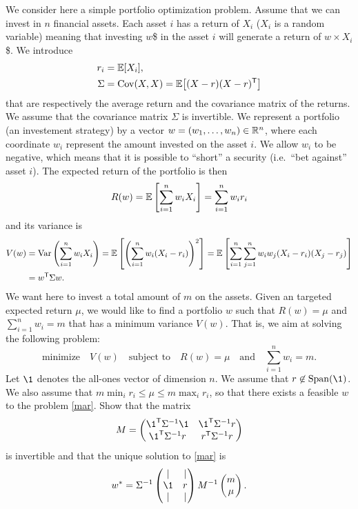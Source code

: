 \documentclass[11pt,nocut]{article}
\begin{document}
\begin{problem}[$\star$]
	We consider here a simple portfolio optimization problem.
	Assume that we can invest in $n$ financial assets. Each asset $i$ has a return of $X_i$ ($X_i$ is a random variable) meaning that investing $w$\$ in the asset $i$ will generate a return of $w \times X_i$ \$. We introduce
	\begin{align*}
		r_i &= \mathbb{E}[X_i], \\
		\Sigma &= {{\rm Cov}}(X,X) = \mathbb{E}\big[(X-r) (X-r)^{{\sf T}}\big]
	\end{align*}
	that are respectively the average return and the covariance matrix of the returns. 
	We assume that the covariance matrix $\Sigma$ is invertible. We represent a portfolio (an investement strategy) by a vector $w = (w_1, \dots, w_n) \in \mathbb{R}^n$, where each coordinate $w_i$ represent the amount invested on the asset $i$. 
	We allow $w_i$ to be negative, which means that it is possible to ``short'' a security (i.e.\ ``bet against'' asset $i$).
	The expected return of the portfolio is then
	$$
	R(w) = \mathbb{E} \left[\sum_{i=1}^n w_i X_i\right] = \sum_{i=1}^n w_i r_i
	$$
	and its variance is
	\begin{align*}
	V(w) 
	&= {{\rm Var}} \left(\sum_{i=1}^n w_i X_i\right) 
	= \mathbb{E} \left[\left(\sum_{i=1}^n w_i (X_i -r_i)\right)^2\right]
	= \mathbb{E} \left[\sum_{i=1}^n\sum_{j=1}^n w_iw_j (X_i -r_i)(X_j -r_j)\right]
	\\
	&= w^{{\sf T}} \Sigma w.
	\end{align*}
	We want here to invest a total amount of $m$ on the assets. 
	Given an targeted expected return $\mu$, we would like to find a portfolio $w$ such that $R(w)=\mu$ and $\sum_{i=1}^n w_i = m$ that has a minimum variance $V(w)$.
	That is, we aim at solving the following problem:
	\begin{equation}\label{mar}
		\text{minimize} \quad
		V(w) \quad \text{subject to} \quad
		R(w) = \mu \quad \text{and} \quad \sum_{i=1}^n w_i = m.
	\end{equation}
	Let $\1$ denotes the all-ones vector of dimension $n$. We assume that $r \not\in \Span(\1)$.
	We also assume that $m \min_i r_i \leq \mu \leq m \max_i r_i$, so that there exists a feasible $w$ to the problem \eqref{mar}.
	Show that the matrix
	$$
	M = 
	\begin{pmatrix}
		\1^{\sT} \Sigma^{-1} \1 & \1^{\sT} \Sigma^{-1} r \\
		\1^{\sT} \Sigma^{-1} r & r^{\sT} \Sigma^{-1} r
	\end{pmatrix}
	$$
	is invertible and that the unique solution to \eqref{mar} is
	$$
	w^* = \Sigma^{-1} 
	\begin{pmatrix}
		| & | \\
		\1 & r \\
		| & |
	\end{pmatrix}
	M^{-1} 
	\begin{pmatrix}
		m \\
		\mu
	\end{pmatrix}.
	$$
\end{problem}



\vspace{1cm}
\centerline{}

%
%
\end{document}
